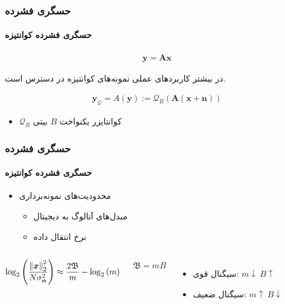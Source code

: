 \begin{frame}
\frametitle{حسگری فشرده}
\framesubtitle{حسگری فشرده کوانتیزه}
\begin{align}
\label{eq2}
\bm{y}=\bm{A}\bm{x}
\end{align}
\pause
\begin{block}{}
\centering
در بیشتر کاربرد‌های عملی نمونه‌های کوانتیزه در دسترس است.
\end{block}

\begin{align}
\label{eq3}
\bm{y}_{\mathcal{Q}} =A(\bm{y}):= \mathcal{Q}_{B}\left(\bm{A}(\bm{x}+\bm{n})\right)
\end{align}
\begin{itemize}
\item{$\mathcal{Q}_{B}$
کوانتایزر یکنواخت
$B$
بیتی}
\end{itemize}

\end{frame}
\begin{frame}
\frametitle{حسگری فشرده}
\framesubtitle{حسگری فشرده کوانتیزه}
\begin{itemize}
\item{محدودیت‌های نمونه‌برداری}
\begin{itemize}
\item{مبدل‌های آنالوگ به دیجیتال}
\item{نرخ انتقال داده}
\end{itemize}
\end{itemize}
\pause
\begin{columns} 

\begin{block}{}
\begin{align}
\label{eq5}
\log_{2}\left( \dfrac{\left\lVert\bm{x}\right\rVert_{2}^{2}}{N \sigma^{2}_{\bm{n}}}\right)\approx \dfrac{2\mathfrak{B}}{m}-\log_{2}\left(m\right)
\end{align}
\end{block}
\begin{center}
$\mathfrak{B}=mB$
\end{center}
\pause
\begin{itemize}
\item{سیگنال قوی: $m\downarrow~ B \uparrow$}
\item{سیگنال ضعیف: $m\uparrow~ B \downarrow$}
\end{itemize}
\end{columns}
\cite{laska2012regime}
\end{frame}
